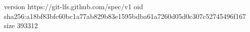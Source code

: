 version https://git-lfs.github.com/spec/v1
oid sha256:a18bf83bfc60bc1a77ab829b83e1595bdba61a7260d05d0c307c52745496f167
size 393312
